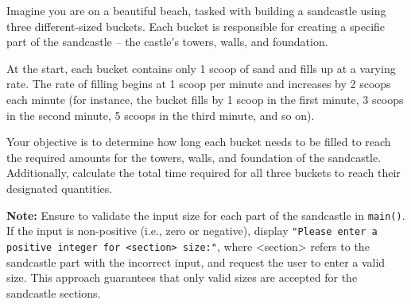 Imagine you are on a beautiful beach, tasked with building a sandcastle using three different-sized buckets. Each bucket is responsible for creating a specific part of the sandcastle – the castle's towers, walls, and foundation.

At the start, each bucket contains only 1 scoop of sand and fills up at a varying rate. The rate of filling begins at 1 scoop per minute and increases by 2 scoops each minute (for instance, the bucket fills by 1 scoop in the first minute, 3 scoops in the second minute, 5 scoops in the third minute, and so on).

Your objective is to determine how long each bucket needs to be filled to reach the required amounts for the towers, walls, and foundation of the sandcastle. Additionally, calculate the total time required for all three buckets to reach their designated quantities.

\textbf{Note:} Ensure to validate the input size for each part of the sandcastle in \texttt{main()}. If the input is non-positive (i.e., zero or negative), display \texttt{"Please enter a positive integer for <section> size:"}, where <section> refers to the sandcastle part with the incorrect input, and request the user to enter a valid size. This approach guarantees that only valid sizes are accepted for the sandcastle sections.

